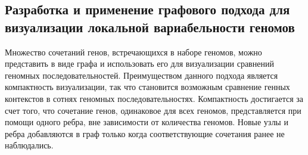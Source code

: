 \begin{table}[htbp]
\centering
\caption{Список оперонов статистически значимо пере-представленных в группе штаммов \textit{E. coli} изолированных от пациентов с болезнью Крона. N - количество генов, Pobs - наблюдаемая доля перепредставленных генов в опероне, Pmean - средняя доля перепредставленных генов при случайных пермутациях, Pmax - максимальная доля перепредставленных генов при случайных пермутациях.}
\label{tbl:ops1}
\setlength{\fboxsep}{10pt}%
\setlength{\fboxrule}{0pt}%
\end{table}


\subsection*{Разработка и применение графового подхода для визуализации локальной вариабельности геномов}

Множество сочетаний генов, встречающихся в наборе геномов, можно представить в виде графа и использовать его для визуализации сравнений геномных последовательностей. Преимуществом данного подхода является компактность визуализации, так что становится возможным сравнение генных контекстов в сотнях геномных последовательностях. Компактность достигается за счет того, что сочетание генов, одинаковое для всех геномов, представляется при помощи одного ребра, вне зависимости от количества геномов. Новые узлы и ребра добавляются в граф только когда соответствующие сочетания ранее не наблюдались. 

